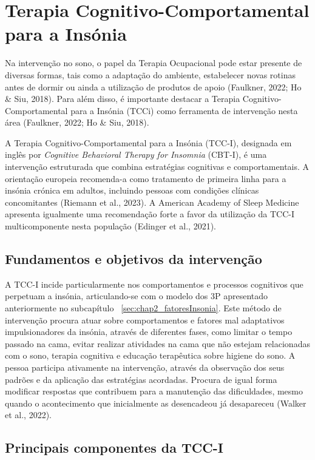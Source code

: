 \section{Terapia Cognitivo-Comportamental para a Insónia} 
\label{sec:chap2_tcc} %

Na intervenção no sono, o papel da Terapia Ocupacional pode estar presente de diversas formas, tais como a adaptação do ambiente, estabelecer novas rotinas antes de dormir ou ainda a utilização de produtos de apoio (Faulkner, 2022; Ho \& Siu, 2018). Para além disso, é importante destacar a Terapia Cognitivo-Comportamental para a Insónia (TCCi) como ferramenta de intervenção nesta área (Faulkner, 2022; Ho \& Siu, 2018). 

A Terapia Cognitivo-Comportamental para a Insónia (TCC-I), designada em inglês por \textit{Cognitive Behavioral Therapy for Insomnia} (CBT-I), é uma intervenção estruturada que combina estratégias cognitivas e comportamentais. A orientação europeia recomenda-a como tratamento de primeira linha para a insónia crónica em adultos, incluindo pessoas com condições clínicas concomitantes (Riemann et al., 2023). A American Academy of Sleep Medicine apresenta igualmente uma recomendação forte a favor da utilização da TCC-I multicomponente nesta população (Edinger et al., 2021).

\subsection{Fundamentos e objetivos da intervenção}
\label{sec:chap2_fundamentoTCC}

A TCC-I incide particularmente nos comportamentos e processos cognitivos que perpetuam a insónia, articulando-se com o modelo dos 3P apresentado anteriormente no subcapítulo ~\ref{sec:chap2_fatoresInsonia}. Este método de intervenção procura atuar sobre comportamentos e fatores mal adaptativos impulsionadores da insónia, através de diferentes fases, como limitar o tempo passado na cama, evitar realizar atividades na cama que não estejam relacionadas com o sono, terapia cognitiva e educação terapêutica sobre higiene do sono. A pessoa participa ativamente na intervenção, através da observação dos seus padrões e da aplicação das estratégias acordadas. Procura de igual forma modificar respostas que contribuem para a manutenção das dificuldades, mesmo quando o acontecimento que inicialmente as desencadeou já desapareceu (Walker et al., 2022).

\subsection{Principais componentes da TCC-I}
\label{sec:chap2_componenteTCC}

